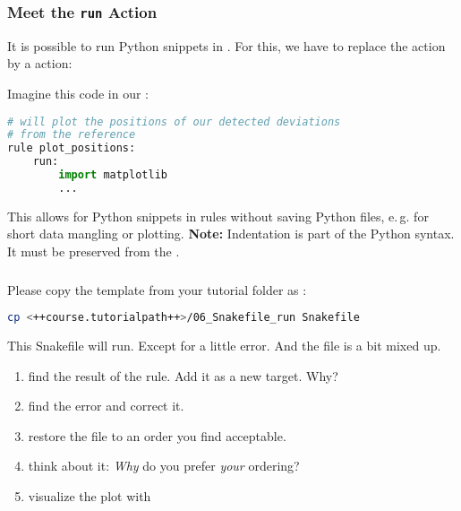 \begin{frame}[fragile]
  \frametitle{Meet the \texttt{run} Action}
  \vspace{-0.5em}
  It is possible to run Python snippets in \Snakemake{}. For this, we have to replace the  action by a  action:\vspace{-0.5em}
  \begin{task}
  	Imagine this code in our :
  \end{task}\vspace{-0.5em}
  \begin{lstlisting}[language=Python,style=Python, basicstyle=\footnotesize]
# will plot the positions of our detected deviations
# from the reference
rule plot_positions:
    run:
        import matplotlib
        ...
  \end{lstlisting}
  \vspace{-0.5em}
  \pause\footnotesize
  \begin{hint}
     This allows for Python snippets in rules without saving Python files, e.\,g. for short data mangling or plotting.\newline
     \textbf{Note:} Indentation is part of the Python syntax. It must be preserved from the .
  \end{hint}
\end{frame}

\begin{frame}[fragile]
	\frametitle{}
	Please copy the  template from your tutorial folder as :
	\begin{lstlisting}[language=Bash, style=Shell]
cp <++course.tutorialpath++>/06_Snakefile_run Snakefile
    \end{lstlisting}
    \pause
    \begin{task}
    	This Snakefile will run. Except for a little error. And the file is a bit mixed up.
    	\begin{enumerate}
    		\item find the result of the  rule. Add it as a new target. Why?
    		\item find the error and correct it.
    		\item restore the file to an order you find acceptable.
    		\item think about it: \emph{Why} do you prefer \emph{your} ordering?
    		\item visualize the plot with 
    	\end{enumerate}
    \end{task}
\end{frame}

